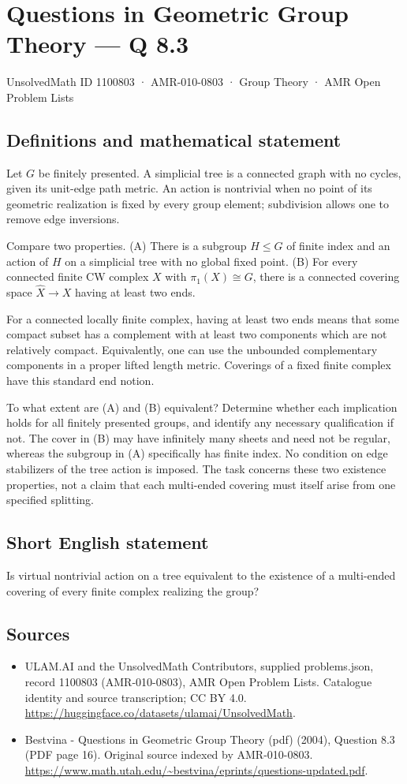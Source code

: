 \documentclass[11pt,a4paper]{article}
\begin{document}
\section*{Questions in Geometric Group Theory — Q 8.3}\label{1100803}
{\small UnsolvedMath ID 1100803 · AMR-010-0803 · Group Theory · AMR Open Problem Lists}
\subsection{Definitions and mathematical statement}
Let $G$ be finitely presented. A simplicial tree is a connected graph with no cycles, given its unit-edge path metric. An action is nontrivial when no point of its geometric realization is fixed by every group element; subdivision allows one to remove edge inversions.

Compare two properties. (A) There is a subgroup $H\leq G$ of finite index and an action of $H$ on a simplicial tree with no global fixed point. (B) For every connected finite CW complex $X$ with $\pi_1(X)\cong G$, there is a connected covering space $\widehat X\to X$ having at least two ends.

For a connected locally finite complex, having at least two ends means that some compact subset has a complement with at least two components which are not relatively compact. Equivalently, one can use the unbounded complementary components in a proper lifted length metric. Coverings of a fixed finite complex have this standard end notion.

To what extent are (A) and (B) equivalent? Determine whether each implication holds for all finitely presented groups, and identify any necessary qualification if not. The cover in (B) may have infinitely many sheets and need not be regular, whereas the subgroup in (A) specifically has finite index. No condition on edge stabilizers of the tree action is imposed. The task concerns these two existence properties, not a claim that each multi-ended covering must itself arise from one specified splitting.
\subsection{Short English statement}
Is virtual nontrivial action on a tree equivalent to the existence of a multi-ended covering of every finite complex realizing the group?
\subsection{Sources}
\begin{itemize}
\item[S1] ULAM.AI and the UnsolvedMath Contributors, supplied problems.json, record 1100803 (AMR-010-0803), AMR Open Problem Lists. Catalogue identity and source transcription; CC BY 4.0.
\url{https://huggingface.co/datasets/ulamai/UnsolvedMath}.
\item[S2] Bestvina - Questions in Geometric Group Theory (pdf) (2004), Question 8.3 (PDF page 16). Original source indexed by AMR-010-0803.
\url{https://www.math.utah.edu/~bestvina/eprints/questions-updated.pdf}.
\end{itemize}
\end{document}
